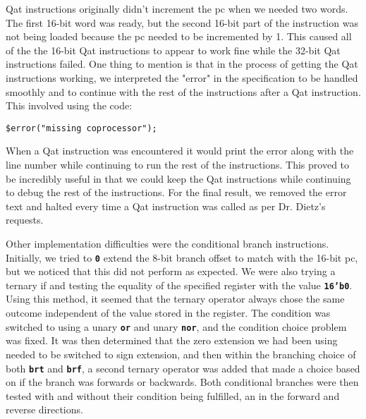 \documentclass{sig-alternate-05-2015}
\begin{document}
Qat instructions originally didn't increment the pc when we needed two words. The first 16-bit word was ready, but the second 16-bit part of the instruction was not being loaded because the pc needed to be incremented by 1. This caused all of the the 16-bit Qat instructions to appear to work fine while the 32-bit Qat instructions failed. One thing to mention is that in the process of getting the Qat instructions working, we interpreted the "error" in the specification to be handled smoothly and to continue with the rest of the instructions after a Qat instruction. This involved using the code:
\begin{verbatim}$error("missing coprocessor");
\end{verbatim}
When a Qat instruction was encountered it would print the error along with the line number while continuing to run the rest of the instructions. This proved to be incredibly useful in that we could keep the Qat instructions while continuing to debug the rest of the instructions. For the final result, we removed the error text and halted every time a Qat instruction was called as per Dr. Dietz's requests.

Other implementation difficulties were the conditional branch instructions. Initially, we tried to \texttt{\textbf{0}} extend the 8-bit branch offset to match with the 16-bit pc, but we noticed that this did not perform as expected. We were also trying a ternary if and testing the equality of the specified register with the value \texttt{\textbf{16'b0}}. Using this method, it seemed that the ternary operator always chose the same outcome independent of the value stored in the register. The condition was switched to using a unary \texttt{\textbf{or}} and unary \texttt{\textbf{nor}}, and the condition choice problem was fixed. It was then determined that the zero extension we had been using needed to be switched to sign extension, and then within the branching choice of both \texttt{\textbf{brt}} and \texttt{\textbf{brf}}, a second ternary operator was added that made a choice based on if the branch was forwards or backwards. Both conditional branches were then tested with and without their condition being fulfilled, an in the forward and reverse directions.
\end{document}
